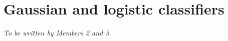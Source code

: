 \section{Gaussian and logistic classifiers}
\label{sec:models}
\emph{To be written by Members 2 and 3.}
